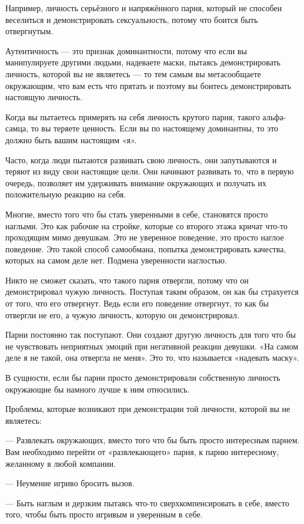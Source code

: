 Например, личность серьёзного и напряжённого парня, который не способен веселиться и демонстрировать сексуальность, потому что боится быть отвергнутым.

Аутентичность --- это признак доминантности, потому что если вы манипулируете другими людьми, надеваете маски, пытаясь демонстрировать личность, которой вы не являетесь --- то тем самым вы метасообщаете окружающим, что вам есть что прятать и поэтому вы боитесь демонстрировать настоящую личность.

Когда вы пытаетесь примерять на себя личность крутого парня, такого альфа-самца, то вы теряете ценность. Если вы по настоящему доминантны, то это должно быть вашим настоящим «я».

Часто, когда люди пытаются развивать свою личность, они запутываются и теряют из виду свои настоящие цели. Они начинают развивать то, что в первую очередь, позволяет им удерживать внимание окружающих и получать их положительную реакцию на себя.

Многие, вместо того что бы стать уверенными в себе, становятся просто наглыми. Это как рабочие на стройке, которые со второго этажа кричат что-то проходящим мимо девушкам. Это не уверенное поведение, это просто наглое поведение. Это такой способ самообмана, попытка демонстрировать качества, которых на самом деле нет. Подмена уверенности наглостью.

Никто не сможет сказать, что такого парня отвергли, потому что он демонстрировал чужую личность. Поступая таким образом, он как бы страхуется от того, что его отвергнут. Ведь если его поведение отвергнут, то как бы отвергли не его, а чужую личность, которую он демонстрировал.

Парни постоянно так поступают. Они создают другую личность для того что бы не чувствовать неприятных эмоций при негативной реакции девушки. «На самом деле я не такой, она отвергла не меня». Это то, что называется «надевать маску».

В сущности, если бы парни просто демонстрировали собственную личность окружающие бы намного лучше к ним относились.

Проблемы, которые возникают при демонстрации той личности, которой вы не являетесь:

--- Развлекать окружающих, вместо того что бы быть просто интересным парнем. Вам необходимо перейти от «развлекающего» парня, к парню интересному, желанному в любой компании.

--- Неумение игриво бросить вызов.

--- Быть наглым и дерзким пытаясь что-то сверхкомпенсировать в себе, вместо того, чтобы быть просто игривым и уверенным в себе.

